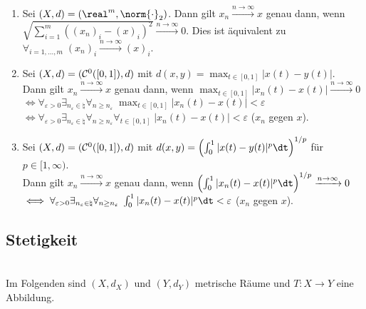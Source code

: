 \begin{Bsp}
    \begin{enumerate}[label=\emph{(\alph*)}]
        \item
        Sei $(X, d) = (\real^m, \norm{\cdot}_2)$.
        Dann gilt $x_n \xrightarrow{n \to \infty} x$ genau dann, wenn\\
        $\sqrt{\sum_{i=1}^m ((x_n)_i - (x)_i)^2} \xrightarrow{n \to \infty} 0$.
        Dies ist äquivalent zu $\forall_{i=1,\dotsc,m}\; (x_n)_i \xrightarrow{n \to \infty} (x)_i$.

        \item
        Sei $(X, d) = (\mathcal{C}^0([0, 1]), d)$ mit $d(x, y) = \max_{t \in [0, 1]} |x(t) - y(t)|$.\\
        Dann gilt $x_n \xrightarrow{n \to \infty} x$ genau dann, wenn
        $\max_{t \in [0, 1]} |x_n(t) - x(t)| \xrightarrow{n \to \infty} 0$\\
        $\iff \forall_{\varepsilon > 0} \exists_{n_\varepsilon \in \natural}
        \forall_{n \ge n_\varepsilon}\; \max_{t \in [0, 1]} |x_n(t) - x(t)| < \varepsilon$\\
        $\iff \forall_{\varepsilon > 0} \exists_{n_\varepsilon \in \natural}
        \forall_{n \ge n_\varepsilon} \forall_{t \in [0, 1]}\; |x_n(t) - x(t)| < \varepsilon$
        ($x_n$  gegen $x$).

        \item
        Sei $(X, d) = (\mathcal{C}^0([0, 1]), d)$ mit
        $d(x, y) = \left(\int_0^1 |x(t) - y(t)|^p \dt\right)^{1/p}$ für $p \in [1, \infty)$.\\
        Dann gilt $x_n \xrightarrow{n \to \infty} x$ genau dann, wenn
        $\left(\int_0^1 |x_n(t) - x(t)|^p \dt\right)^{1/p} \xrightarrow{n \to \infty} 0$\\
        $\iff \forall_{\varepsilon > 0} \exists_{n_\varepsilon \in \natural}
        \forall_{n \ge n_\varepsilon}\; \int_0^1 |x_n(t) - x(t)|^p\dt < \varepsilon$
        ($x_n$  gegen $x$).
    \end{enumerate}
\end{Bsp}

\subsection{%
    Stetigkeit%
}

\begin{Bem}\\
    Im Folgenden sind $(X, d_X)$ und $(Y, d_Y)$ metrische Räume und
    $T\colon X \rightarrow Y$ eine Abbildung.
\end{Bem}

